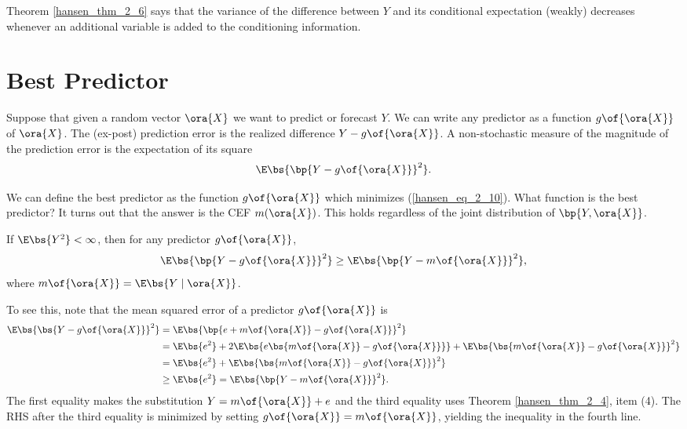 Theorem \ref{hansen_thm_2_6} says that the variance of the difference between $Y$ and its conditional expectation (weakly) decreases whenever an additional variable is added to the conditioning information.

\section{Best Predictor}

Suppose that given a random vector $\ora{X}$ we want to predict or forecast $Y$. We can write any predictor as a function $g\of{\ora{X}}$ of $\ora{X}$. The (ex-post) prediction error is the realized difference $Y - g\of{\ora{X}}$. A non-stochastic measure of the magnitude of the prediction error is the expectation of its square
\begin{equation}
    \label{hansen_eq_2_10}
    \E\bs{\bp{Y - g\of{\ora{X}}}^2}.
\end{equation}

We can define the best predictor as the function $g\of{\ora{X}}$ which minimizes (\ref{hansen_eq_2_10}). What function is the best predictor? It turns out that the answer is the CEF $m(\ora{X})$. This holds regardless of the joint distribution of $\bp{Y, \ora{X}}$.

\begin{theorem}
    \label{hansen_thm_2_7}

    If $\E\bs{Y^2} < \infty$, then for any predictor $g\of{\ora{X}}$, 
    \begin{equation}
        \notag
        \E\bs{\bp{Y - g\of{\ora{X}}}^2} \geq \E\bs{\bp{Y - m\of{\ora{X}}}^2},
    \end{equation}
    where $m\of{\ora{X}} = \E\bs{Y \mid \ora{X}}$.
\end{theorem}

To see this, note that the mean squared error of a predictor $g\of{\ora{X}}$ is 
\begin{equation}
    \notag 
    \begin{aligned}
        \E\bs{\bs{Y - g\of{\ora{X}}}^2} & = \E\bs{\bp{e + m\of{\ora{X}} - g\of{\ora{X}}}^2} \\
        & = \E\bs{e^2} + 2\E\bs{e\bs{m\of{\ora{X}} - g\of{\ora{X}}}} +\E\bs{\bs{m\of{\ora{X}} - g\of{\ora{X}}}^2} \\
        & = \E\bs{e^2} + \E\bs{\bs{m\of{\ora{X}} - g\of{\ora{X}}}^2} \\
        & \geq \E\bs{e^2} = \E\bs{\bp{Y - m\of{\ora{X}}}^2}.
    \end{aligned}
\end{equation}
The first equality makes the substitution $Y = m\of{\ora{X}} + e$ and the third equality uses Theorem \ref{hansen_thm_2_4}, item (4). The RHS after the third equality is minimized by setting $g\of{\ora{X}} = m\of{\ora{X}}$, yielding the inequality in the fourth line. 


